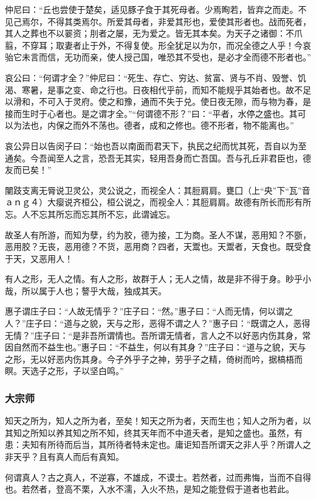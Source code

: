 \documentclass[]{article}
\begin{document}
仲尼曰：``丘也尝使于楚矣，适见豚子食于其死母者。少焉眴若，皆弃之而走。不见己焉尔，不得其类焉尔。所爱其母者，非爱其形也，爱使其形者也。战而死者，其人之葬也不以翣资；刖者之屡，无为爱之。皆无其本矣。为天子之诸御：不爪翦，不穿耳；取妻者止于外，不得复使。形全犹足以为尔，而况全德之人乎！今哀骀它未言而信，无功而亲，使人授己国，唯恐其不受也，是必才全而德不形者也。''

哀公曰：``何谓才全？''仲尼曰：``死生、存亡、穷达、贫富、贤与不肖、毁誉、饥渴、寒暑，是事之变、命之行也。日夜相代乎前，而知不能规乎其始者也。故不足以滑和，不可入于灵府。使之和豫，通而不失于兑。使日夜无隙，而与物为春，是接而生时于心者也。是之谓才全。''``何谓德不形？''曰：``平者，水停之盛也。其可以为法也，内保之而外不荡也。德者，成和之修也。德不形者，物不能离也。''

哀公异日以告闵子曰：``始也吾以南面而君天下，执民之纪而忧其死，吾自以为至通矣。今吾闻至人之言，恐吾无其实，轻用吾身而亡吾国。吾与孔丘非君臣也，德友而已矣！''

闉跂支离无脣说卫灵公，灵公说之，而视全人：其脰肩肩。甕囗（上``央''下``瓦''音ａｎｇ４）大瘿说齐桓公，桓公说之，而视全人：其脰肩肩。故德有所长而形有所忘。人不忘其所忘而忘其所不忘，此谓诚忘。

故圣人有所游，而知为孽，约为胶，德为接，工为商。圣人不谋，恶用知？不斵，恶用胶？无丧，恶用德？不货，恶用商？四者，天鬻也。天鬻者，天食也。既受食于天，又恶用人！

有人之形，无人之情。有人之形，故群于人；无人之情，故是非不得于身。眇乎小哉，所以属于人也；謷乎大哉，独成其天。

惠子谓庄子曰：``人故无情乎？''庄子曰：``然。''惠子曰：``人而无情，何以谓之人？''庄子曰：``道与之貌，天与之形，恶得不谓之人？''惠子曰：``既谓之人，恶得无情？''庄子曰：``是非吾所谓情也。吾所谓无情者，言人之不以好恶内伤其身，常因自然而不益生也。''惠子曰：``不益生，何以有其身？''庄子曰：``道与之貌，天与之形，无以好恶内伤其身。今子外乎子之神，劳乎子之精，倚树而吟，据槁梧而瞑。天选子之形，子以坚白鸣。''

\hypertarget{header-n143}{%
\subsubsection{大宗师}\label{header-n143}}

知天之所为，知人之所为者，至矣！知天之所为者，天而生也；知人之所为者，以其知之所知以养其知之所不知，终其天年而不中道夭者，是知之盛也。虽然，有患：夫知有所待而后当，其所待者特未定也。庸讵知吾所谓天之非人乎？所谓人之非天乎？且有真人而后有真知。

何谓真人？古之真人，不逆寡，不雄成，不谟士。若然者，过而弗悔，当而不自得也。若然者，登高不栗，入水不濡，入火不热，是知之能登假于道者也若此。
\end{document}
